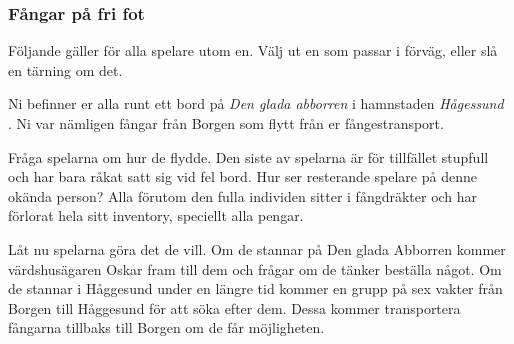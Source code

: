 \subsubsection{Fångar på fri fot}
Följande gäller för alla spelare utom en. Välj ut en som passar i förväg, eller slå en tärning om det.
\begin{displayquote}
	Ni befinner er alla runt ett bord på \textit{Den glada abborren} i hamnstaden \textit{Hågessund	} \sectiondescribe{\ref{haggesund:denGladaAbborren}}. Ni var nämligen fångar från Borgen \sectiondescribe{\ref{borgen}} som flytt från er fångestransport.
\end{displayquote}
Fråga spelarna om hur de flydde. Den siste av spelarna är för tillfället stupfull och har bara råkat satt sig vid fel bord. Hur ser resterande spelare på denne okända person? Alla förutom den fulla individen sitter i fångdräkter och har förlorat hela sitt inventory, speciellt alla pengar.

Låt nu spelarna göra det de vill. Om de stannar på Den glada Abborren kommer värdshusägaren Oskar fram till dem och frågar om de tänker beställa något. Om de stannar i Håggesund under en längre tid kommer en grupp på sex vakter från Borgen till Håggesund för att söka efter dem. Dessa kommer transportera fångarna tillbaks till Borgen om de får möjligheten.